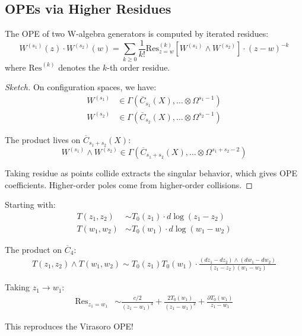 \subsection{OPEs via Higher Residues}

\begin{theorem}\label{thm:w-geometric-ope}
The OPE of two W-algebra generators is computed by iterated residues:
\begin{equation}
W^{(s_1)}(z) \cdot W^{(s_2)}(w) = \sum_{k \geq 0} \frac{1}{k!} \mathrm{Res}^{(k)}_{z=w}\left[W^{(s_1)} \wedge W^{(s_2)}\right] \cdot (z-w)^{-k}
\end{equation}
where $\mathrm{Res}^{(k)}$ denotes the $k$-th order residue.
\end{theorem}

\begin{proof}[Sketch]
On configuration spaces, we have:
\begin{align}
W^{(s_1)} &\in \Gamma(\overline{C}_{s_1}(X), \ldots \otimes \Omega^{s_1-1}) \\
W^{(s_2)} &\in \Gamma(\overline{C}_{s_2}(X), \ldots \otimes \Omega^{s_2-1})
\end{align}

The product lives on $\overline{C}_{s_1+s_2}(X)$:
\begin{equation}
W^{(s_1)} \wedge W^{(s_2)} \in \Gamma(\overline{C}_{s_1+s_2}(X), \ldots \otimes \Omega^{s_1+s_2-2})
\end{equation}

Taking residue as points collide extracts the singular behavior, which gives OPE coefficients. Higher-order poles come from higher-order collisions.
\end{proof}

\begin{computation}
Starting with:
\begin{align}
T(z_1, z_2) &\sim T_0(z_1) \cdot d\log(z_1-z_2) \\
T(w_1, w_2) &\sim T_0(w_1) \cdot d\log(w_1-w_2)
\end{align}

The product on $\overline{C}_4$:
\begin{multline}
T(z_1,z_2) \wedge T(w_1,w_2) \sim T_0(z_1) T_0(w_1) \cdot \frac{(dz_1-dz_2) \wedge (dw_1-dw_2)}{(z_1-z_2)(w_1-w_2)}
\end{multline}

Taking $z_1 \to w_1$:
\begin{align}
\mathrm{Res}_{z_1=w_1} &\sim \frac{c/2}{(z_1-w_1)^4} + \frac{2T_0(w_1)}{(z_1-w_1)^2} + \frac{\partial T_0(w_1)}{z_1-w_1}
\end{align}

This reproduces the Virasoro OPE!
\end{computation}

